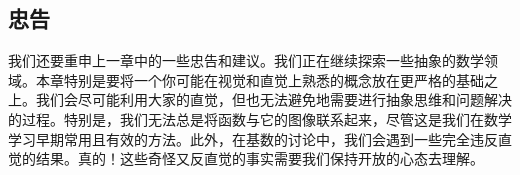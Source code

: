 
\subsection{忠告}

我们还要重申上一章中的一些忠告和建议。我们正在继续探索一些抽象的数学领域。本章特别是要将一个你可能在视觉和直觉上熟悉的概念放在更严格的基础之上。我们会尽可能利用大家的直觉，但也无法避免地需要进行抽象思维和问题解决的过程。特别是，我们无法总是将函数与它的图像联系起来，尽管这是我们在数学学习早期常用且有效的方法。此外，在基数的讨论中，我们会遇到一些完全违反直觉的结果。真的！这些奇怪又反直觉的事实需要我们保持开放的心态去理解。